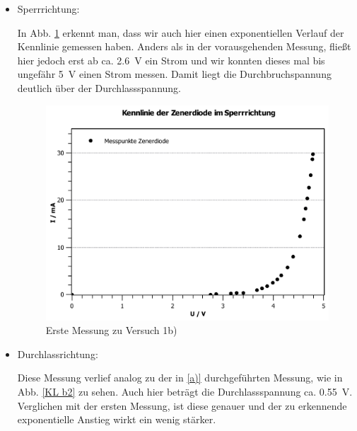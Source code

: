 \documentclass[11pt,a4paper,titlepage, ngerman]{article}
\begin{document}
				 \begin{itemize}
				 	
				 	\item Sperrrichtung: 
				 	
				 	In Abb. \ref{KL b1} erkennt man, dass wir auch hier einen exponentiellen Verlauf der Kennlinie gemessen haben. 				 	
				 	Anders als in der vorausgehenden Messung, fließt hier jedoch erst ab ca. \SI{2.6}{\V} ein Strom und wir konnten dieses mal bis ungefähr \SI{5}{\V} einen Strom messen.
				 	Damit liegt die Durchbruchspannung deutlich über der Durchlassspannung.
				 	
				 	\begin{figure}
				 		\centering
				 		\includegraphics[width=\textwidth]{KennlinieZenerdiodeSperrrichtung.pdf}
				 		\caption{Erste Messung zu Versuch 1b)}
				 		\label{KL b1}
				 	\end{figure}
				 	
				 	\item Durchlassrichtung:  
				 	
				 	Diese Messung verlief analog zu der in \ref{a)} durchgeführten Messung, wie in Abb. \ref{KL b2} zu sehen.
				 	Auch hier beträgt die Durchlassspannung ca. \SI{0,55}{\V}.
				 	Verglichen mit der ersten Messung, ist diese genauer und der zu erkennende exponentielle Anstieg wirkt ein wenig stärker.
				 	

\end{itemize}
\end{document}
